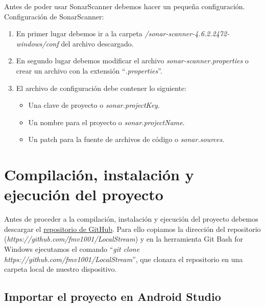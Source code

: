 Antes de poder usar SonarScanner debemos hacer un pequeña configuración.\\

Configuración de SonarScanner:

\begin{enumerate}
\item
	En primer lugar debemos ir a la carpeta \textit{/sonar-scanner-4.6.2.2472-windows/conf} del archivo descargado.
\item
	En segundo lugar debemos modificar el archivo \textit{sonar-scanner.properties} o crear un archivo con la extensión ``\textit{.properties}''.
\item 
	El archivo de configuración debe contener lo siguiente:
	\begin{itemize}
	\item
		Una clave de proyecto o \textit{sonar.projectKey}.
	\item
		Un nombre para el proyecto o \textit{sonar.projectName}.
	\item
		Un patch para la fuente de archivos de código o \textit{sonar.sources}.
	\end{itemize}
\end{enumerate}



\section{Compilación, instalación y ejecución del proyecto}

Antes de proceder a la compilación, instalación y ejecución del proyecto debemos descargar el \href{https://github.com/fmv1001/LocalStream}{repositorio de GitHub}.
Para ello copiamos la dirección del repositorio (\textit{https://github.com/fmv1001/LocalStream}) y en la herramienta Git Bash for Windows ejecutamos el comando ``\textit{git clone https://github.com/fmv1001/LocalStream}'', que clonara el repositorio en una carpeta local de nuestro dispositivo.

\subsection{Importar el proyecto en Android Studio}

